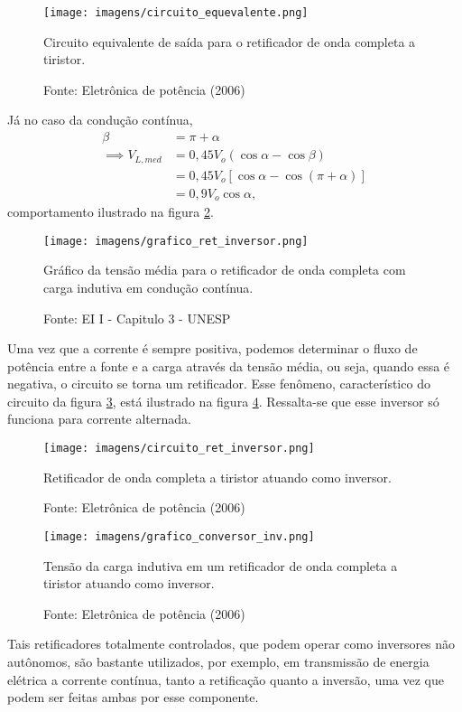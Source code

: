 \begin{figure}[h]
\center
\texttt{[image: imagens/circuito\_equevalente.png]}
\caption{Circuito equivalente de saída para o retificador de onda completa a tiristor.}\label{cgretioc}
\caption*{Fonte: Eletrônica de potência (2006)}
\end{figure}

Já no caso da condução contínua,
\begin{align*}
\beta &= \pi + \alpha \\
\implies V_{L,med} &= 0,45V_{o}(\cos\alpha - \cos\beta) \\
&= 0,45V_{o}[\cos\alpha - \cos(\pi+\alpha)] \\
&= 0,9V_{o}\cos\alpha
,\end{align*}
comportamento ilustrado na figura \ref{gretinv}.

\begin{figure}[h]
\center
\texttt{[image: imagens/grafico\_ret\_inversor.png]}
\caption{Gráfico da tensão média para o retificador de onda completa com carga indutiva em condução contínua.}\label{gretinv}
\caption*{Fonte:  EI I - Capitulo 3 - UNESP}
\end{figure}

Uma vez que a corrente é sempre positiva, podemos determinar o fluxo de potência entre a fonte e a carga através da tensão média, ou seja, quando essa é negativa, o circuito se torna um retificador. Esse fenômeno, característico do circuito da figura \ref{cretoc}, está ilustrado na figura \ref{gretiocb}. Ressalta-se que esse inversor só funciona para corrente alternada.

\begin{figure}[h]
\center
\texttt{[image: imagens/circuito\_ret\_inversor.png]}
\caption{Retificador de onda completa a tiristor atuando como inversor.}\label{cretoc}
\caption*{Fonte: Eletrônica de potência (2006)}
\end{figure}

\begin{figure}[h]
\center
\texttt{[image: imagens/grafico\_conversor\_inv.png]}
\caption{Tensão da carga indutiva em um retificador de onda completa a tiristor atuando como inversor.}\label{gretiocb}
\caption*{Fonte: Eletrônica de potência (2006)}
\end{figure}

Tais retificadores totalmente controlados, que podem operar como inversores não autônomos, são bastante utilizados, por exemplo, em transmissão de energia elétrica a corrente contínua, tanto a retificação quanto a inversão, uma vez que podem ser feitas ambas por esse componente.

